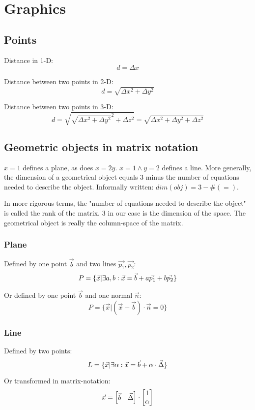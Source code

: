 \section{Graphics}

\subsection{Points}

Distance in 1-D:
$$ d = \Delta x $$

Distance between two points in 2-D: 
$$ d = \sqrt{\Delta x^2 + \Delta y^2} $$

Distance between two points in 3-D:
$$ d = \sqrt{ \sqrt{\Delta x^2 + \Delta y^2}^2 + \Delta z^2 } = \sqrt{\Delta x^2 + \Delta y^2 + \Delta z^2}$$


\subsection{Geometric objects in matrix notation}

$x=1$ defines a plane, as does $x=2y$. $x=1 \land y=2$ defines a line. 
More generally, the dimension of a geometrical object equals 3 minus the number of equations needed to describe the object.
Informally written: $ dim(obj) = 3 - \#(=) $.

In more rigorous terms, the "number of equations needed to describe the object" is called the rank of the matrix. 3 in our case is the dimension of the space. The geometrical object is really the column-space of the matrix. 


\subsubsection{Plane}

Defined by one point $\vec{b}$ and two lines $\vec{p_1}, \vec{p_2}$: 
$$ P = \{ \vec{x} | \exists a,b:  \vec{x} = \vec{b} + a\vec{p_1} + b\vec{p_2} \} $$

Or defined by one point $\vec{b}$ and one normal $\vec{n}$:
$$ P = \{ \vec{x} | ( \vec{x} - \vec{b} )\cdot \vec{n} = 0 \} $$


\subsubsection{Line}

Defined by two points: 
$$ L = \{ \vec{x} | \exists \alpha:  \vec{x} = \vec{b} + \alpha \cdot \vec{\Delta}  \}$$

Or transformed in matrix-notation:
$$ 
\vec{x} = 
\begin{bmatrix}
    \vec{b} & \vec{\Delta}
\end{bmatrix}
\cdot
 \begin{bmatrix}  1 \\ \alpha  \\ \end{bmatrix} 
$$

